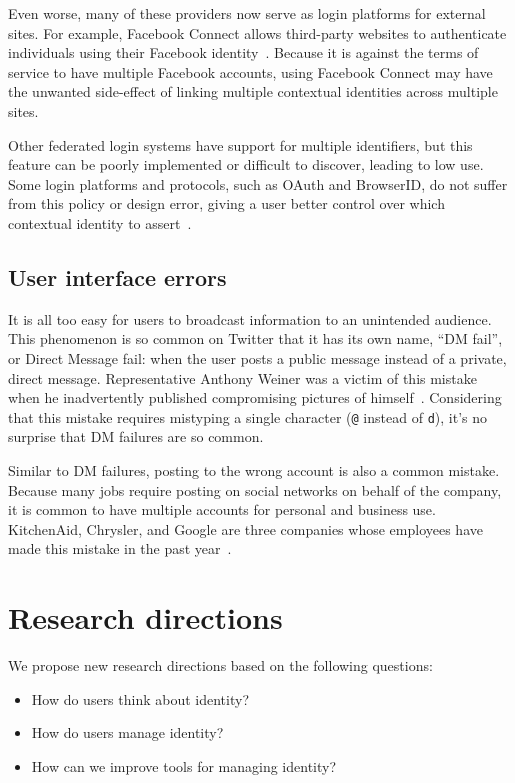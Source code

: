 \documentclass[10pt, conference, compsocconf]{IEEEtran}
\begin{document}
Even worse, many of these providers now serve as login platforms for external
sites. For example, Facebook Connect allows third-party websites to
authenticate individuals using their Facebook identity~\cite{fb_connect}.  Because it
is against the terms of service to have multiple Facebook accounts, using
Facebook Connect may have the unwanted side-effect of linking multiple
contextual identities across multiple sites.

Other federated login systems have support for multiple identifiers, but this
feature can be poorly implemented or difficult to discover, leading to low use.
Some login platforms and protocols, such as OAuth and BrowserID, do not suffer
from this policy or design error, giving a user better
control over which contextual identity to assert~\cite{browserid,oauth}.

\subsection{User interface errors}
It is all too easy for users to broadcast information to
an unintended audience. This phenomenon is so common on Twitter that it has its
own name, ``DM fail'', or Direct Message fail: when the user posts a public
message instead of a private, direct message. Representative Anthony Weiner was
a victim of this mistake when he inadvertently published compromising pictures
of himself~\cite{weiner}. Considering that this mistake requires
mistyping a single character (\texttt{@} instead of \texttt{d}), it's no
surprise that DM failures are so common.

Similar to DM failures, posting to the wrong account is also a common mistake.
Because many jobs require posting on social networks on behalf of the company,
it is common to have multiple accounts for personal and business use.
KitchenAid, Chrysler, and Google are three companies whose employees have
made this mistake in the past year~\cite{kitchenaid,chrysler,yegge}.

\section{Research directions}
We propose new research directions based on the following questions:
\begin{itemize}
\item How do users think about identity?
\item How do users manage identity?
\item How can we improve tools for managing identity?
\end{itemize}
\end{document}
